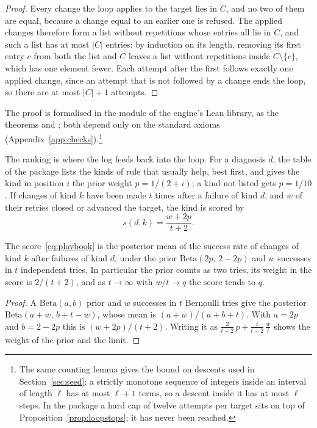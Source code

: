 \begin{proof}
Every change the loop applies to the target lies in $C$, and no two of them are equal, because a change equal to an earlier one is refused. The applied changes therefore form a list without repetitions whose entries all lie in $C$, and such a list has at most $|C|$ entries: by induction on its length, removing its first entry $c$ from both the list and $C$ leaves a list without repetitions inside $C\setminus\{c\}$, which has one element fewer. Each attempt after the first follows exactly one applied change, since an attempt that is not followed by a change ends the loop, so there are at most $|C|+1$ attempts.
\end{proof}

The proof is formalised in the module  of the engine's Lean library, as the theorems  and ; both depend only on the standard axioms (Appendix~\ref{app:checks}).\footnote{The same counting lemma gives the bound on descents used in Section~\ref{sec:seed}: a strictly monotone sequence of integers inside an interval of length $\ell$ has at most $\ell+1$ terms, so a descent inside it has at most $\ell$ steps. In the package a hard cap of twelve attempts per target sits on top of Proposition~\ref{prop:loopstops}; it has never been reached.}

The ranking is where the log feeds back into the loop. For a diagnosis $d$, the table of the package lists the kinds of rule that usually help, best first, and gives the kind in position $i$ the prior weight $p=1/(2+i)$; a kind not listed gets $p=1/10$. If changes of kind $k$ have been made $t$ times after a failure of kind $d$, and $w$ of their retries closed or advanced the target, the kind is scored by
\begin{equation}\label{eq:playbook}
s(d,k)=\frac{w+2p}{t+2}.
\end{equation}

\begin{proposition}\label{prop:playbook}
The score~\eqref{eq:playbook} is the posterior mean of the success rate of changes of kind $k$ after failures of kind $d$, under the prior $\mathrm{Beta}(2p,\,2-2p)$ and $w$ successes in $t$ independent tries. In particular the prior counts as two tries, its weight in the score is $2/(t+2)$, and as $t\to\infty$ with $w/t\to q$ the score tends to $q$.
\end{proposition}

\begin{proof}
A $\mathrm{Beta}(a,b)$ prior and $w$ successes in $t$ Bernoulli tries give the posterior $\mathrm{Beta}(a+w,\,b+t-w)$, whose mean is $(a+w)/(a+b+t)$. With $a=2p$ and $b=2-2p$ this is $(w+2p)/(t+2)$. Writing it as $\tfrac{2}{t+2}\,p+\tfrac{t}{t+2}\,\tfrac{w}{t}$ shows the weight of the prior and the limit.
\end{proof}

